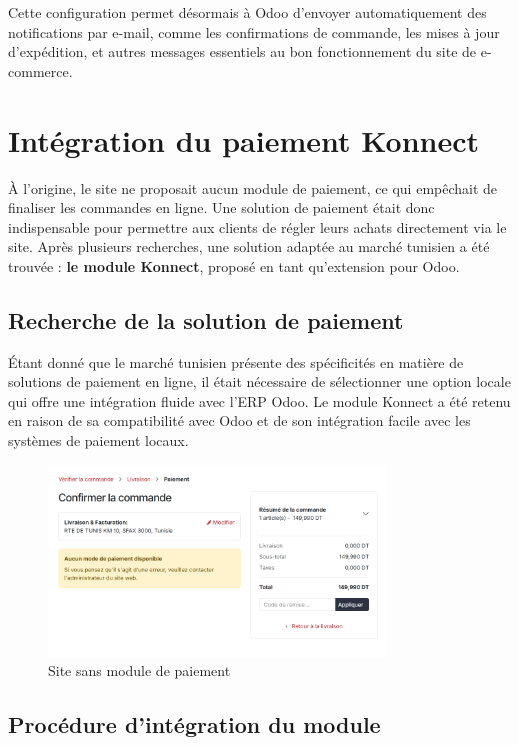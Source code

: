 \documentclass[12pt]{report}
\begin{document}
Cette configuration permet désormais à Odoo d'envoyer automatiquement des notifications par e-mail, comme les confirmations de commande, les mises à jour d'expédition, et autres messages essentiels au bon fonctionnement du site de e-commerce.




\section{Intégration du paiement Konnect}

À l’origine, le site ne proposait aucun module de paiement, ce qui empêchait de finaliser les commandes en ligne. Une solution de paiement était donc indispensable pour permettre aux clients de régler leurs achats directement via le site. Après plusieurs recherches, une solution adaptée au marché tunisien a été trouvée : \textbf{le module Konnect}, proposé en tant qu'extension pour Odoo.

\subsection{Recherche de la solution de paiement}

Étant donné que le marché tunisien présente des spécificités en matière de solutions de paiement en ligne, il était nécessaire de sélectionner une option locale qui offre une intégration fluide avec l'ERP Odoo. Le module Konnect a été retenu en raison de sa compatibilité avec Odoo et de son intégration facile avec les systèmes de paiement locaux.

\begin{figure}[H]
\centering
\includegraphics[width=0.8\textwidth]{images/site_sans_module_payement.PNG}
\caption{Site sans module de paiement}
\end{figure}

\subsection{Procédure d'intégration du module}
\end{document}
